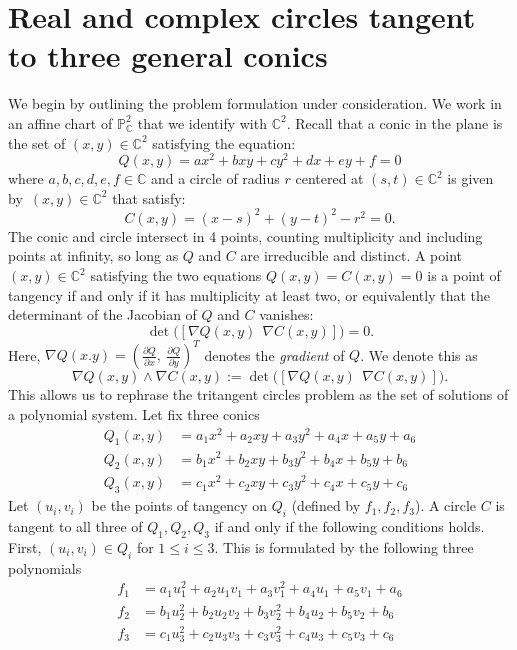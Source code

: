 \documentclass[12pt]{amsart}
\theoremstyle{definition}
\theoremstyle{definition}
\numberwithin{equation}{section}
\newcommand{\CC}{\mathbb{C}}
\begin{document}
\section{Real and complex circles tangent to three general conics}\label{sec:circles}
We begin by outlining the problem formulation under consideration. We work in an affine chart of $\mathbb{P}^{2}_{\mathbb{C}}$ that we identify with $\mathbb{C}^{2}$. Recall that a conic in the plane is the set of $(x,y) \in \CC^2$ satisfying the equation:
\begin{equation}\label{def_Q}
Q(x,y)=ax^{2}+bxy+cy^{2}+dx+ey+f = 0
\end{equation}
where $a,b,c,d,e,f \in \CC$ and a circle of radius $r$ centered at $(s,t) \in \CC^2 $ is given by~$(x,y) \in \CC^2$ that satisfy:
$$C(x,y)= (x-s)^{2}+(y-t)^{2}-r^{2} = 0.$$
The conic and circle intersect in 4 points, counting multiplicity and including points at infinity, so long as $Q$ and $C$ are irreducible and distinct. 
A point $(x,y)\in\mathbb{C}^{2}$ satisfying the two equations $Q(x,y)=C(x,y)=0$ is a point of tangency if and only if it has multiplicity at least two, or equivalently that the determinant of the Jacobian of $Q$ and $C$ vanishes:
$$
\det \big( [\nabla Q(x,y) \ \ 
\nabla C(x,y)] \big) = 0.$$
Here, 
$\nabla Q(x.y) = (\tfrac{\partial Q}{\partial x},\ \tfrac{\partial Q}{\partial y})^T$
denotes the \emph{gradient} of $Q$.
We denote this as 
$$\nabla Q(x,y) \wedge \nabla C(x,y) := \det \big( [\nabla Q(x,y) \ \ 
\nabla C(x,y)] \big).$$
This allows us to rephrase the tritangent circles problem as the set of solutions of a polynomial system. Let fix three conics 
\begin{align*}
    Q_{1}(x,y) &= a_{1}x^{2} + a_{2}xy + a_{3}y^{2} + a_{4}x + a_{5}y + a_{6} \\
    Q_{2}(x,y) &= b_{1}x^{2} + b_{2}xy + b_{3}y^{2} + b_{4}x + b_{5}y + b_{6} \\
    Q_{3}(x,y) &= c_{1}x^{2} + c_{2}xy + c_{3}y^{2} + c_{4}x + c_{5}y + c_{6}
\end{align*}
Let $(u_{i},v_{i})$ be the points of tangency on $Q_{i}$ (defined by $f_{1}, f_{2}, f_{3}$). A circle $C$ is tangent to all three of $Q_{1},Q_{2},Q_{3}$ if and only if the following conditions holds. First, $(u_{i},v_{i})\in Q_i$ for $1\leq i\leq 3$. This is formulated by the following three polynomials
\begin{align*}
    f_{1} &= a_{1}u_{1}^{2} + a_{2}u_{1}v_{1} + a_{3}v_{1}^{2} + a_{4}u_{1} + a_{5}v_{1} + a_{6}\\\nonumber
    f_{2} &= b_{1}u_{2}^{2} + b_{2}u_{2}v_{2} + b_{3}v_{2}^{2} + b_{4}u_{2} + b_{5}v_{2} + b_{6}\\\nonumber
    f_{3} &= c_{1}u_{3}^{2} + c_{2}u_{3}v_{3} + c_{3}v_{3}^{2} + c_{4}u_{3} + c_{5}v_{3} + c_{6}
\end{align*}
\end{document}
